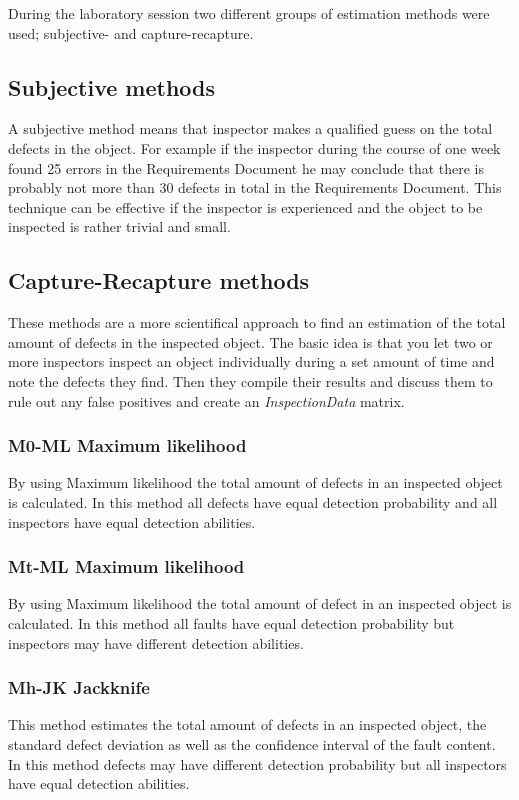 During the laboratory session two different groups of estimation methods were used; subjective- and capture-recapture.

\subsection{Subjective methods}
A subjective method means that inspector makes a qualified guess on the total defects in the object. 
For example if the inspector during the course of one week found 25 errors in the Requirements Document he may conclude that there is probably not more than 30 defects in total in the Requirements Document.
This technique can be effective if the inspector is experienced and the object to be inspected is rather trivial and small.
\subsection{Capture-Recapture methods}
These methods are a more scientifical approach to find an estimation of the total amount of defects in the inspected object.
The basic idea is that you let two or more inspectors inspect an object individually during a set amount of time and note the defects they find.
Then they compile their results and discuss them to rule out any false positives and create an \textit{InspectionData} matrix.

\subsubsection{M0-ML Maximum likelihood}
By using Maximum likelihood the total amount of defects in an inspected object is calculated. 
In this method all defects have equal detection probability and all inspectors have equal detection abilities.
\subsubsection{Mt-ML Maximum likelihood}
By using Maximum likelihood the total amount of defect in an inspected object is calculated. 
In this method all faults have equal detection probability but inspectors may have different detection abilities.
\subsubsection{Mh-JK Jackknife}
This method estimates the total amount of defects in an inspected object, the standard defect deviation as well as the confidence interval of the fault content. 
In this method defects may have different detection probability but all inspectors have equal detection abilities. 
